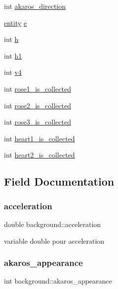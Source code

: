 \begin{DoxyCompactItemize}
int \hyperlink{structbackground_a4b620d611d7055c27479194a91626b90}{akaros\+\_\+direction}
\item 
\hyperlink{structentity}{entity} \hyperlink{structbackground_a53770c5147db56d89224f0d4f25a9dcc}{e}
\item 
int \hyperlink{structbackground_a79458e48b5c7a6f0c54df249d4029e0c}{h}
\item 
int \hyperlink{structbackground_aab4666fdad851fe5a948513424247eee}{h1}
\item 
int \hyperlink{structbackground_add459e778424b8d7a87713503581a554}{v4}
\item 
int \hyperlink{structbackground_a78e4a29c3d724b173cf2dc83999e4f7c}{rose1\+\_\+is\+\_\+collected}
\item 
int \hyperlink{structbackground_a2671be8bb6ee7b97afb8d8112e3ecac1}{rose2\+\_\+is\+\_\+collected}
\item 
int \hyperlink{structbackground_a76af0a764d6136e82c284ea9ffc5c216}{rose3\+\_\+is\+\_\+collected}
\item 
int \hyperlink{structbackground_a6b1ac003cf763a41a3ae149ae2960b55}{heart1\+\_\+is\+\_\+collected}
\item 
int \hyperlink{structbackground_a772cfb2b19e4d374985066cb04acc4ce}{heart2\+\_\+is\+\_\+collected}
\end{DoxyCompactItemize}


\subsection{Field Documentation}
\mbox{\label{structbackground_a457498e3187247c1af1491513c7d0f1a}} 
\subsubsection{\texorpdfstring{acceleration}{acceleration}}
{\footnotesize\ttfamily double background\+::acceleration}

variable double pour acceleration \mbox{\label{structbackground_aa04607c52132818019f45bad76948694}} 
\subsubsection{\texorpdfstring{akaros\+\_\+appearance}{akaros\_appearance}}
{\footnotesize\ttfamily int background\+::akaros\+\_\+appearance}

